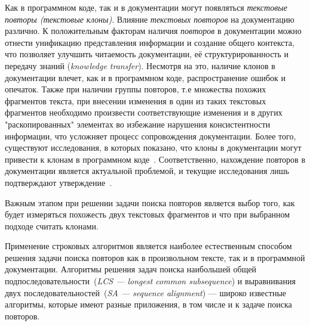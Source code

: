 Как в программном коде, так и в документации могут появляться \emph{текстовые повторы (текстовые клоны)}.
Влияние  \emph{текстовых повторов} на документацию различно.
К положительным факторам наличия \emph{повторов} в документации можно отнести
унификацию представления информации и создание общего контекста, что позволяет улучшить читаемость документации, её структурированность и передачу знаний (\emph{knowledge transfer}).
Несмотря на это, наличие клонов в документации влечет, как и в программном коде,  распространение ошибок и опечаток.
Также при наличии группы повторов, т.е множества похожих  фрагментов текста, при внесении изменения в один из таких текстовых фрагментов необходимо произвести соответствующие изменения и в других "раскопированных" элементах во избежание нарушения консистентности информации, что усложняет процесс сопровождения документации.
Более того, существуют исследования, в которых показано, что клоны в документации могут привести к клонам в программном коде~\cite{juergens2010can}.
Соответственно, нахождение повторов в документации является актуальной проблемой, и текущие исследования лишь подтверждают утверждение~\cite{horie2010tool, poruban2014reusable, poruban2016preliminary, juergens2010can, oumaziz2017documentation}.

Важным этапом при решении задачи поиска повторов является выбор того, как будет измеряться похожесть двух текстовых фрагментов и что при выбранном подходе считать клонами.


Применение строковых алгоритмов является наиболее естественным способом решения задачи поиска повторов как в произвольном тексте, так и в программной документации.
Алгоритмы решения задач поиска наибольшей общей подпоследовательности~(\emph{LCS --- longest common subsequence}) и выравнивания двух последовательностей~(\emph{SA  --- sequence alignment}) --- широко известные алгоритмы, которые имеют разные приложения, в том числе и к задаче поиска повторов.

